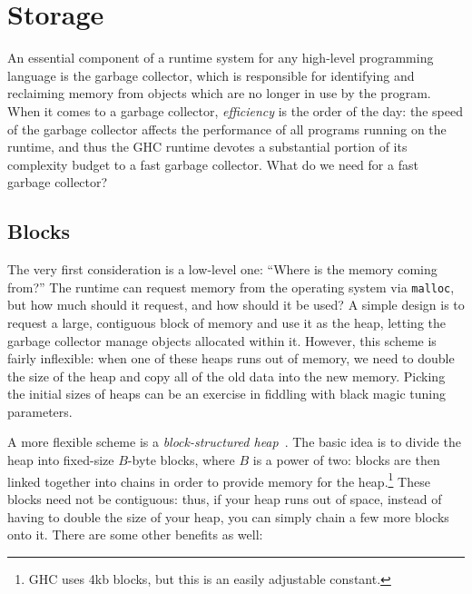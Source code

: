\section{Storage}

An essential component of a runtime system for any high-level
programming language is the garbage collector, which is responsible for
identifying and reclaiming memory from objects which are no longer in
use by the program.  When it comes to a garbage collector,
\emph{efficiency} is the order of the day: the speed of the garbage
collector affects the performance of all programs running on the
runtime, and thus the GHC runtime devotes a substantial portion of its
complexity budget to a fast garbage collector.  What do we need for
a fast garbage collector?

\subsection{Blocks}

The very first consideration is a low-level one: ``Where is the memory coming
from?''  The runtime can request memory from the operating system via
\verb|malloc|, but how much should it request, and how should it be
used?  A simple design is to request a large, contiguous block of memory
and use it as the heap, letting the garbage collector manage objects allocated
within it.  However, this scheme is fairly inflexible: when one of these heaps
runs out of memory, we need to double the size of the heap and copy all of the
old data into the new memory.  Picking the initial sizes of heaps can be an exercise
in fiddling with black magic tuning parameters.

A more flexible scheme is a \emph{block-structured heap}~\cite{maclisp,Dybvig94don'tstop,Marlow:2008:PGG:1375634.1375637}.
The basic idea is to divide the heap into fixed-size $B$-byte blocks,
where $B$ is a power of two: blocks are then linked together into chains in order to
provide memory for the heap.\footnote{GHC uses 4kb blocks, but this is an easily
adjustable constant.}  These blocks need not be contiguous: thus, if your
heap runs out of space, instead of having to double the size of your heap,
you can simply chain a few more blocks onto it.  There are some other benefits as well:

